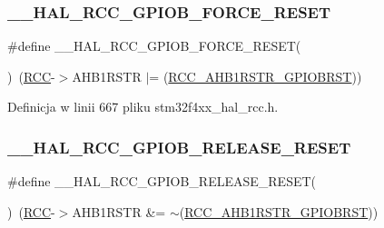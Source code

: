 \subsubsection{\texorpdfstring{\+\_\+\+\_\+\+H\+A\+L\+\_\+\+R\+C\+C\+\_\+\+G\+P\+I\+O\+B\+\_\+\+F\+O\+R\+C\+E\+\_\+\+R\+E\+S\+ET}{\_\_HAL\_RCC\_GPIOB\_FORCE\_RESET}}
{\footnotesize\ttfamily \#define \+\_\+\+\_\+\+H\+A\+L\+\_\+\+R\+C\+C\+\_\+\+G\+P\+I\+O\+B\+\_\+\+F\+O\+R\+C\+E\+\_\+\+R\+E\+S\+ET(\begin{DoxyParamCaption}{ }\end{DoxyParamCaption})~(\hyperlink{group___peripheral__declaration_ga74944438a086975793d26ae48d5882d4}{R\+CC}-\/$>$A\+H\+B1\+R\+S\+TR $\vert$= (\hyperlink{group___peripheral___registers___bits___definition_ga8e60d32cb67768339fc47a2ba11b7a97}{R\+C\+C\+\_\+\+A\+H\+B1\+R\+S\+T\+R\+\_\+\+G\+P\+I\+O\+B\+R\+ST}))}



Definicja w linii 667 pliku stm32f4xx\+\_\+hal\+\_\+rcc.\+h.

\mbox{\label{group___r_c_c___a_h_b1___force___release___reset_gaf03da3b36478071844fbd77df618a686}} 
\subsubsection{\texorpdfstring{\+\_\+\+\_\+\+H\+A\+L\+\_\+\+R\+C\+C\+\_\+\+G\+P\+I\+O\+B\+\_\+\+R\+E\+L\+E\+A\+S\+E\+\_\+\+R\+E\+S\+ET}{\_\_HAL\_RCC\_GPIOB\_RELEASE\_RESET}}
{\footnotesize\ttfamily \#define \+\_\+\+\_\+\+H\+A\+L\+\_\+\+R\+C\+C\+\_\+\+G\+P\+I\+O\+B\+\_\+\+R\+E\+L\+E\+A\+S\+E\+\_\+\+R\+E\+S\+ET(\begin{DoxyParamCaption}{ }\end{DoxyParamCaption})~(\hyperlink{group___peripheral__declaration_ga74944438a086975793d26ae48d5882d4}{R\+CC}-\/$>$A\+H\+B1\+R\+S\+TR \&= $\sim$(\hyperlink{group___peripheral___registers___bits___definition_ga8e60d32cb67768339fc47a2ba11b7a97}{R\+C\+C\+\_\+\+A\+H\+B1\+R\+S\+T\+R\+\_\+\+G\+P\+I\+O\+B\+R\+ST}))}



